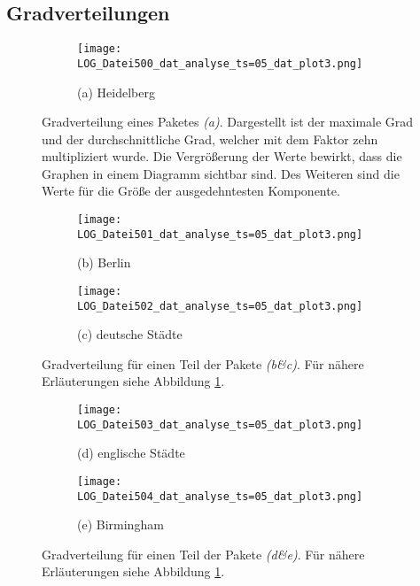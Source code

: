 \documentclass[fontsize=11pt, twoside, a4paper]{scrartcl}
\begin{document}
\subsection{Gradverteilungen}
\label{sec:St11}
\begin{figure}[H]
\centering
	\begin{minipage}[t]{0.75\textwidth}
		\begin{figure}[H]
		\texttt{[image: LOG\_Datei500\_dat\_analyse\_ts=05\_dat\_plot3.png]}
		\caption*{(a) Heidelberg}
		\end{figure}
	\end{minipage}
\caption{Gradverteilung eines Paketes \textit{(a)}. Dargestellt ist der maximale Grad und der durchschnittliche Grad, welcher mit dem Faktor zehn multipliziert wurde. Die Vergrößerung der Werte bewirkt, dass die Graphen in einem Diagramm sichtbar sind. Des Weiteren sind die Werte für die Größe der ausgedehntesten Komponente.}	
\label{degree}
\end{figure}

\begin{figure}
	\begin{minipage}[t]{0.75\textwidth}
		\begin{figure}[H]
		\texttt{[image: LOG\_Datei501\_dat\_analyse\_ts=05\_dat\_plot3.png]}
		\caption*{(b) Berlin}
		\end{figure}
	\end{minipage}
	\begin{minipage}[t]{0.75\textwidth}
		\begin{figure}[H]
		\texttt{[image: LOG\_Datei502\_dat\_analyse\_ts=05\_dat\_plot3.png]}
		\caption*{(c) deutsche Städte}
		\end{figure}
	\end{minipage}
\caption{Gradverteilung für einen Teil der Pakete \textit{(b\&c)}. Für nähere Erläuterungen siehe Abbildung \ref{degree}.}
\end{figure}

\begin{figure}
		\begin{minipage}[t]{0.75\textwidth}
		\begin{figure}[H]
		\texttt{[image: LOG\_Datei503\_dat\_analyse\_ts=05\_dat\_plot3.png]}
		\caption*{(d) englische Städte}
		\end{figure}
	\end{minipage}
	\begin{minipage}[t]{0.75\textwidth}
		\begin{figure}[H]
		\texttt{[image: LOG\_Datei504\_dat\_analyse\_ts=05\_dat\_plot3.png]}
		\caption*{(e) Birmingham}
		\end{figure}
	\end{minipage}
\caption{Gradverteilung für einen Teil der Pakete \textit{(d\&e)}. Für nähere Erläuterungen siehe Abbildung \ref{degree}.}
\end{figure}
\end{document}

